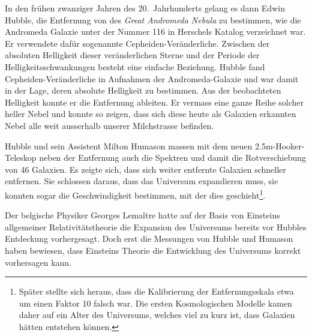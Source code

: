 In den frühen zwanziger Jahren des 20.~Jahrhunderts gelang es dann
Edwin Hubble, die Entfernung von des {\em Great Andromeda Nebula}
zu bestimmen, wie
die Andromeda Galaxie unter der Nummer 116 in Herschels Katalog verzeichnet
war.
Er verwendete dafür sogenannte Cepheiden-Veränderliche.
Zwischen der absoluten Helligkeit dieser veränderlichen
Sterne und der Periode der Helligkeitsschwankungen besteht
eine einfache Beziehung.
Hubble fand Cepheiden-Veränderliche in Aufnahmen der Andromeda-Galaxie
und war damit in der Lage, deren absolute Helligkeit zu bestimmen.
Aus der beobachteten Helligkeit konnte er die Entfernung ableiten.
Er vermass eine ganze Reihe solcher heller Nebel und konnte so zeigen,
dass sich diese heute als Galaxien erkannten Nebel alle
weit ausserhalb unserer Milchstrasse
befinden.

Hubble und sein Assistent Milton Humason massen mit dem neuen
2.5m-Hooker-Teleskop neben der Entfernung auch die Spektren und
damit die Rotverschiebung von 46 Galaxien.
Es zeigte sich, dass sich weiter entfernte Galaxien schneller 
entfernen.
Sie schlossen daraus, dass das Universum expandieren muss, sie konnten
sogar die Geschwindigkeit bestimmen, mit der dies geschieht\footnote{
Später stellte sich heraus, dass die Kalibrierung der Entfernungsskala
etwa um einen Faktor 10 falsch war. Die ersten Kosmologischen Modelle
kamen daher auf ein Alter des Universums, welches viel zu kurz ist,
dass Galaxien hätten entstehen können.}.

Der belgische Physiker
Georges Lemaître hatte auf der Basis von Einsteins allgemeiner
Relativitätstheorie die Expansion des Universums bereits vor
Hubbles Entdeckung vorhergesagt.
Doch erst die Messungen von Hubble und Humason haben bewiesen,
dass Einsteins Theorie die Entwicklung des Universums korrekt
vorhersagen kann.

